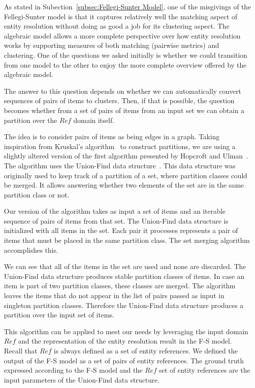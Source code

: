 
As stated in Subection~\ref{subsec:Fellegi-Sunter Model}, one of the misgivings of the Fellegi-Sunter model is that
it captures relatively well the matching aspect of entity resolution without
doing as good a job for its clustering aspect.
The algebraic model allows a more complete perspective over how entity
resolution works by supporting measures of both matching (pairwise metrics)
and clustering.
One of the questions we asked initially is whether we could transition from
one model to the other to enjoy the more complete overview offered by the
algebraic model.

The answer to this question depends on whether we can automatically convert
sequences of pairs of items to clusters.
Then, if that is possible, the question becomes whether from a set of pairs
of items from an input set we can obtain a partition over the $Ref$ domain
itself.

The idea is to consider pairs of items as being edges in a graph.
Taking inspiration from Kruskal's algorithm~\cite{kruskal1956} to construct
partitions, we are using a slightly altered version of the first algorithm
presented by Hopcroft and Ulman~\cite{hopcroft1973set}.
The algorithm uses the Union-Find data structure~\cite{unionfind1964}.
This data structure was originally used to keep track of a partition of a set,
where partition classes could be merged.
It allows answering whether two elements of the set are in the same partition
class or not.

Our version of the algorithm takes as input a set of items and an iterable
sequence of pairs of items from that set.
The Union-Find data structure is initialized with all items in the set.
Each pair it processes represents a pair of items that must be placed in the
same partition class.
The set merging algorithm accomplishes this.

We can see that all of the items in the set are used and none are discarded.
The Union-Find data structure produces stable partition classes of items.
In case an item is part of two partition classes, these classes are merged.
The algorithm leaves the items that do not appear in the list of pairs passed as
input in singleton partition classes.
Therefore the Union-Find data structure produces a partition over the input
set of items.

This algorithm can be applied to meet our needs by leveraging the input domain
$Ref$ and the representation of the entity resolution result in the F-S model.
Recall that $Ref$ is always defined as a set of entity references.
We defined the output of the F-S model as a set of pairs of entity
references.
The ground truth expressed according to the F-S model and the $Ref$ set of
entity references are the input parameters of the Union-Find data structure.

